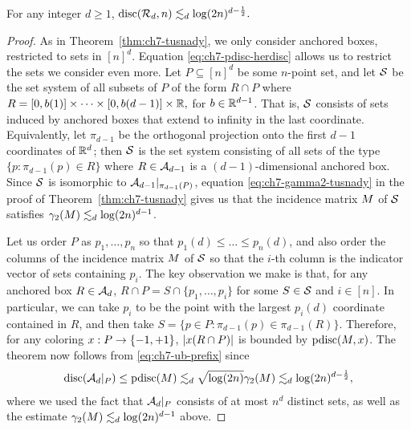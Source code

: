 \begin{theorem}\label{thm:ch7-tusnady-ub}
  For any integer $d \ge 1$,
  \(
    \disc(\RR_d,n) \lesssim_d \log(2n)^{d-\frac12}.
  \)
\end{theorem}
\begin{proof}
  As in Theorem~\ref{thm:ch7-tusnady}, we only consider anchored
  boxes, restricted to sets in $[n]^d$. Equation
  \eqref{eq:ch7-pdisc-herdisc} allows us to restrict the sets we
  consider even more. Let $P \subseteq [n]^d$ be some $n$-point set,
  and let $\SS$ be the set system of all subsets of
  $P$ of the form $R \cap P$ where
  \(
  R = [0,b(1)] \times\cdots \times [0,b({d-1})]\times \R,
  \)
  for $b\in \R^{d-1}$. That is, $\SS$ consists of sets
  induced by anchored boxes that extend to infinity in the last
  coordinate. Equivalently, let $\pi_{d-1}$ be the orthogonal
  projection onto the first $d-1$ coordinates of $\R^d$; then $\SS$ is
  the set system consisting of all sets of the type $\{p: \pi_{d-1}(p)
  \in R\}$ where $R \in \AA_{d-1}$ is a $(d-1)$-dimensional anchored
  box. Since $\SS$ is isomorphic to $\AA_{d-1}|_{\pi_{d-1}(P)}$, equation \eqref{eq:ch7-gamma2-tusnady} in the proof
  of Theorem~\ref{thm:ch7-tusnady} gives us that the incidence matrix
  $\mat$ of $\SS$ satisfies $\gamma_2(\mat)\lesssim_d
  \log(2n)^{d-1}$.


  Let us order $P$ as $p_1, \ldots, p_n$ so that $p_1(d) \le \ldots
  \le p_n(d)$, and also order the columns of the incidence matrix $\mat$ of $\SS$
  so that the $i$-th column is the indicator vector of sets containing $p_i$.
  The key observation we make is that, for any anchored box $R \in
  \AA_d$, $R \cap P = S \cap \{p_1, \ldots, p_i\}$ for some $S \in
  \SS$ and $i \in [n]$. In particular, we can take $p_i$ to be the
  point with the largest $p_i(d)$ coordinate contained in $R$, and then
  take $S = \{p \in P: \pi_{d-1}(p) \in \pi_{d-1}(R)\}$. Therefore, for any
  coloring $\col:P \to \{-1,+1\}$, $|\col(R \cap P)|$ is bounded by
  $\pdisc(\mat, \col)$. The theorem now follows from
  \eqref{eq:ch7-ub-prefix} since
  \[
    \disc(\AA_d|_P) \le \pdisc(\mat)
    \lesssim_d \sqrt{\log(2n)} \gamma_2(\mat)
    \lesssim_d \log(2n)^{d-\frac12},
  \]
  where we used the fact that $\AA_d|_P$ consists of at most $n^d$
  distinct sets, as well as the estimate
  \(\gamma_2(\mat)\lesssim_d  \log(2n)^{d-1}\) above.
\end{proof}

